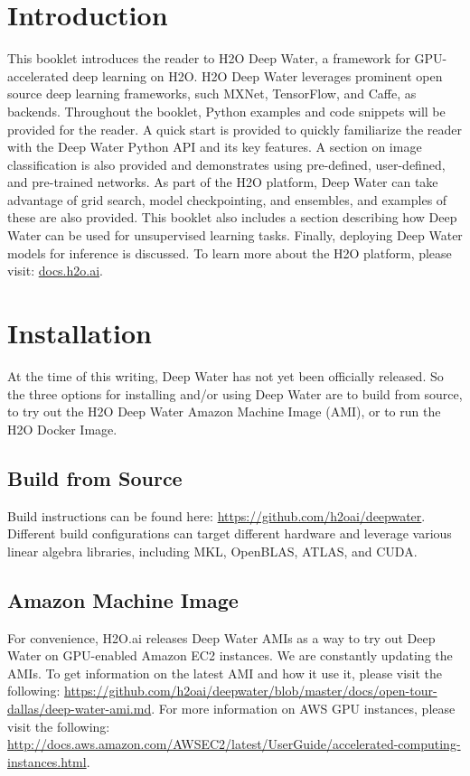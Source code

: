 \section{Introduction}
This booklet introduces the reader to H2O Deep Water, a framework for GPU-accelerated deep learning on H2O.  H2O Deep Water leverages prominent open source deep learning frameworks, such MXNet, TensorFlow, and Caffe, as backends.  Throughout the booklet, Python examples and code snippets will be provided for the reader.  A quick start is provided to quickly familiarize the reader with the Deep Water Python API and its key features.  A section on image classification is also provided and demonstrates using pre-defined, user-defined, and pre-trained networks.  As part of the H2O platform, Deep Water can take advantage of grid search, model checkpointing, and ensembles, and examples of these are also provided.  This booklet also includes a section describing how Deep Water can be used for unsupervised learning tasks.  Finally, deploying Deep Water models for inference is discussed.  To learn more about the H2O platform, please visit: {\url{docs.h2o.ai}}.





\section{Installation}
At the time of this writing, Deep Water has not yet been officially released.  So the three options for installing and/or using Deep Water are to build from source, to try out the H2O Deep Water Amazon Machine Image (AMI), or to run the H2O Docker Image. 

	\subsection{Build from Source}
		Build instructions can be found here: {\url{https://github.com/h2oai/deepwater}}.  Different build configurations can target different hardware and leverage various linear algebra libraries, including MKL, OpenBLAS, ATLAS, and CUDA.
				
	\subsection{Amazon Machine Image}
		For convenience, H2O.ai releases Deep Water AMIs as a way to try out Deep Water on GPU-enabled Amazon EC2 instances.  We are constantly updating the AMIs.  To get information on the latest AMI and how it use it, please visit the following: {\url{https://github.com/h2oai/deepwater/blob/master/docs/open-tour-dallas/deep-water-ami.md}}.  For more information on AWS GPU instances, please visit the following: {\url{http://docs.aws.amazon.com/AWSEC2/latest/UserGuide/accelerated-computing-instances.html}}.
	
